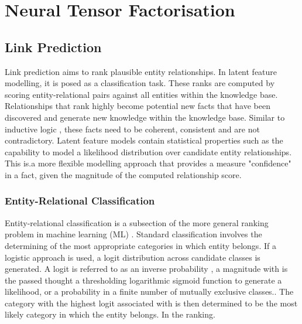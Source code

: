 \chapter{Neural Tensor Factorisation}



\ifpdf
    \graphicspath{{Chapter3/Figs/Raster/}{Chapter3/Figs/PDF/}{Chapter3/Figs/}}
\else
    \graphicspath{{Chapter3/Figs/Vector/}{Chapter3/Figs/}}
\fi

\section{Link Prediction}
Link prediction aims to rank plausible entity relationships. In latent feature modelling, it is posed as a classification task. These ranks are computed by scoring entity-relational pairs against all entities within the knowledge base. Relationships that rank highly become potential new facts that have been discovered and generate new knowledge within the knowledge base. Similar to inductive logic \citet{Rea85,Ancey1996}, these facts need to be coherent, consistent and are not contradictory. Latent feature models contain statistical properties such as the capability to model a likelihood distribution over candidate entity relationships. This is.a more flexible modelling approach that provides a measure "confidence" in a fact, given the magnitude of the computed relationship score. 

\subsection{Entity-Relational Classification}
Entity-relational classification is a subsection of the more general ranking problem in machine learning (ML) \citet{ranking, ranking ranking}. Standard classification involves the determining of the most appropriate categories in which entity belongs. If a logistic approach is used, a logit distribution across candidate classes is generated. A logit is referred to as an inverse probability \citet{wikipedia}, a magnitude with is the passed thought a thresholding logarithmic sigmoid function to generate a likelihood, or a probability in a finite number of mutually exclusive classes.. The category with the highest logit associated with is then determined to be the most likely category in which the entity belongs. In the ranking. 

